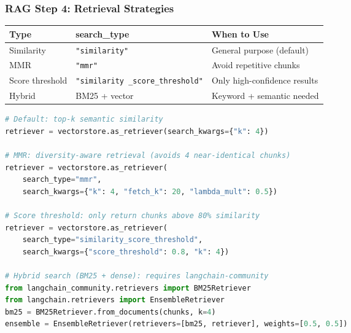 \begin{frame}[fragile]\frametitle{RAG Step 4: Retrieval Strategies}

\begin{center}
\begin{tabular}{|p{3cm}|p{2cm}|p{4cm}|}
\hline
\textbf{Type} & \textbf{search\_type} & \textbf{When to Use} \\
\hline
Similarity & \texttt{"similarity"} & General purpose (default) \\
MMR & \texttt{"mmr"} & Avoid repetitive chunks \\
Score threshold & \texttt{"similarity
\_score\_threshold"} & Only high-confidence results \\
Hybrid & BM25 + vector & Keyword + semantic needed \\
\hline
\end{tabular}
\end{center}

\begin{lstlisting}[language=python,basicstyle=\tiny]
# Default: top-k semantic similarity
retriever = vectorstore.as_retriever(search_kwargs={"k": 4})

# MMR: diversity-aware retrieval (avoids 4 near-identical chunks)
retriever = vectorstore.as_retriever(
    search_type="mmr",
    search_kwargs={"k": 4, "fetch_k": 20, "lambda_mult": 0.5})

# Score threshold: only return chunks above 80% similarity
retriever = vectorstore.as_retriever(
    search_type="similarity_score_threshold",
    search_kwargs={"score_threshold": 0.8, "k": 4})

# Hybrid search (BM25 + dense): requires langchain-community
from langchain_community.retrievers import BM25Retriever
from langchain.retrievers import EnsembleRetriever
bm25 = BM25Retriever.from_documents(chunks, k=4)
ensemble = EnsembleRetriever(retrievers=[bm25, retriever], weights=[0.5, 0.5])
\end{lstlisting}
\end{frame}


